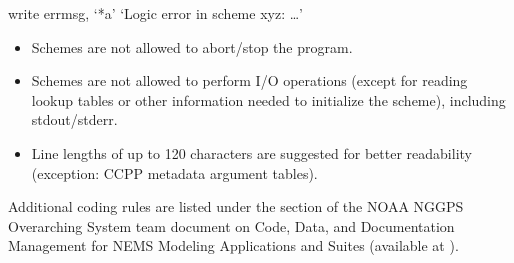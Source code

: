 \documentclass[letterpaper,10pt,english]{sphinxmanual}
\begin{document}
\begin{sphinxVerbatim}[commandchars=\\\{\}]
write errmsg, ‘*a’ ‘Logic error in scheme xyz: …’
  
\end{sphinxVerbatim}
\begin{itemize}
\item {} 
Schemes are not allowed to abort/stop the program.

\item {} 
Schemes are not allowed to perform I/O operations (except for reading lookup tables
or other information needed to initialize the scheme), including stdout/stderr.

\item {} 
Line lengths of up to 120 characters are suggested for better readability (exception: CCPP
metadata argument tables).

\end{itemize}

Additional coding rules are listed under the  section of the NOAA NGGPS
Overarching System team document on Code, Data, and Documentation Management for NEMS
Modeling Applications and Suites (available at
).
\end{document}
